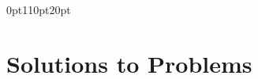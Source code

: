 \documentclass[letterpaper,11pt]{book}
\newif\ifshowbackmatter
\begin{document}




\begingroup{}
\renewcommand{\cleardoublepage}{}
\renewcommand{\clearpage}{}

\addnewlinetotoc{}

\newpage{}
\endgroup{}

\fi  %



\ifshowbackmatter


% 

\backmatter{}

\titleformat{\chapter}[display]
{\normalfont\huge\bfseries\sffamily}{}{25pt}{\chaptitlenonumber}
\titlespacing*{\chapter} {0pt}{110pt}{20pt}


\addnewlinetotoc{}
\clearpage{}


\chapter[\bf Solutions to Problems]{Solutions to Problems}
\end{document}

